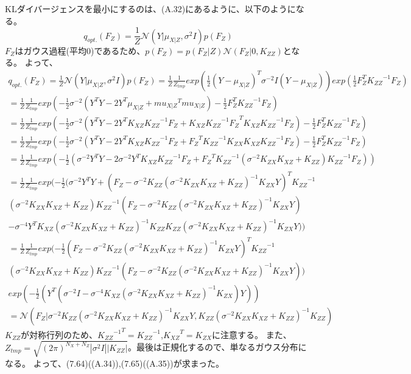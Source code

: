 \documentclass{jsarticle}
\begin{document}
KLダイバージェンスを最小にするのは、(A.32)にあるように、以下のようになる。
\begin{equation}
q_{opt.}(F_Z) = \frac{1}{Z}\mathcal{N}(Y | \mu_{X | Z}, \sigma^2 I)p(F_Z)
\end{equation}
$F_Z$はガウス過程(平均0)であるため、$p(F_Z) = p(F_Z | Z)\mathcal{N}(F_Z | 0, K_{ZZ})$となる。
よって、
\begin{equation}
\begin{split}
q_{opt.}(F_Z) = \frac{1}{Z}\mathcal{N}(Y | \mu_{X | Z}, \sigma^2 I)p(F_Z) 
= \frac{1}{Z}\frac{1}{Z_{tmp}}exp(\frac{1}{2}(Y - \mu_{X | Z})^T \sigma^{-2} I (Y - \mu_{X | Z})) exp(\frac{1}{2}F_Z^T {K_{ZZ}}^{-1} F_Z)\\
= \frac{1}{Z}\frac{1}{Z_{tmp}}exp(-\frac{1}{2}\sigma^{-2}(Y^T Y - 2 Y^T \mu_{X | Z} + {mu_{X | Z}}^T mu_{X | Z}) - \frac{1}{2}F_Z^T {K_{ZZ}}^{-1} F_Z)\\
= \frac{1}{Z}\frac{1}{Z_{tmp}}exp(-\frac{1}{2}\sigma^{-2}(Y^T Y - 2 Y^T K_{XZ}{K_{ZZ}}^{-1}F_Z + {K_{XZ}{K_{ZZ}}^{-1}F_Z}^T K_{XZ}{K_{ZZ}}^{-1}F_Z) - \frac{1}{2}F_Z^T {K_{ZZ}}^{-1} F_Z)\\
= \frac{1}{Z}\frac{1}{Z_{tmp}}exp(-\frac{1}{2}\sigma^{-2}(Y^T Y - 2 Y^T K_{XZ}{K_{ZZ}}^{-1}F_Z + {F_Z}^T {K_{ZZ}}^{-1} K_{ZX} K_{XZ}{K_{ZZ}}^{-1}F_Z) - \frac{1}{2}F_Z^T {K_{ZZ}}^{-1} F_Z)\\
= \frac{1}{Z}\frac{1}{Z_{tmp}}exp(-\frac{1}{2}(\sigma^{-2}Y^T Y - 2 \sigma^{-2} Y^T K_{XZ}{K_{ZZ}}^{-1}F_Z + {F_Z}^T {K_{ZZ}}^{-1} (\sigma^{-2} K_{ZX} K_{XZ} + K_{ZZ}) {K_{ZZ}}^{-1}F_Z))\\
= \frac{1}{Z}\frac{1}{Z_{tmp}}exp(-\frac{1}{2}(\sigma^{-2}Y^T Y 
+ ({F_Z} - \sigma^{-2} K_{ZZ}(\sigma^{-2} K_{ZX} K_{XZ} + K_{ZZ})^{-1}K_{ZX}Y)^T {K_{ZZ}}^{-1} \\(\sigma^{-2} K_{ZX} K_{XZ} + K_{ZZ}) {K_{ZZ}}^{-1}({F_Z} - \sigma^{-2} K_{ZZ}(\sigma^{-2} K_{ZX} K_{XZ} + K_{ZZ})^{-1}K_{ZX}Y)\\
- \sigma^{-4} Y^T K_{XZ} (\sigma^{-2} K_{ZX} K_{XZ} + K_{ZZ})^{-1} K_{ZZ} K_{ZZ}(\sigma^{-2} K_{ZX} K_{XZ} + K_{ZZ})^{-1}K_{ZX}Y))\\
= \frac{1}{Z}\frac{1}{Z_{tmp}}exp(-\frac{1}{2}({F_Z} - \sigma^{-2} K_{ZZ}(\sigma^{-2} K_{ZX} K_{XZ} + K_{ZZ})^{-1}K_{ZX}Y)^T {K_{ZZ}}^{-1} \\(\sigma^{-2} K_{ZX} K_{XZ} + K_{ZZ}) {K_{ZZ}}^{-1}({F_Z} - \sigma^{-2} K_{ZZ}(\sigma^{-2} K_{ZX} K_{XZ} + K_{ZZ})^{-1}K_{ZX}Y))\\
exp(-\frac{1}{2}(Y^T (\sigma^{-2} I - \sigma^{-4} K_{XZ} (\sigma^{-2} K_{ZX} K_{XZ} + K_{ZZ})^{-1} K_{ZX})Y))\\
= \mathcal{N}({F_Z} | \sigma^{-2} K_{ZZ}(\sigma^{-2} K_{ZX} K_{XZ} + K_{ZZ})^{-1}K_{ZX}Y, {K_{ZZ}} (\sigma^{-2} K_{ZX} K_{XZ} + K_{ZZ})^{-1} {K_{ZZ}})
\end{split}
\end{equation}
$K_{ZZ}$が対称行列のため、${{K_{ZZ}}^{-1}}^T = {K_{ZZ}}^{-1}$,${K_{XZ}}^T = K_{ZX}$に注意する。
また、$Z_{tmp} = \sqrt{(2\pi)^{N_X + N_Z}|\sigma^2 I||K_{ZZ}|}$。最後は正規化するので、単なるガウス分布になる。
よって、(7.64)((A.34)),(7.65)((A.35))が求まった。
\end{document}
